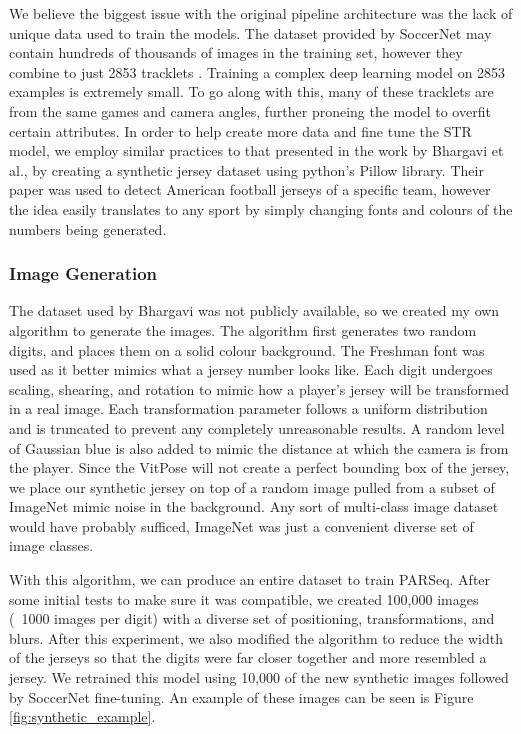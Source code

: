\documentclass[11pt, letterpaper]{article}
\begin{document}
We believe the biggest issue with the original pipeline architecture was the lack of unique data used to train the models. The dataset provided by SoccerNet may contain hundreds of thousands of images in the training set, however they combine to just 2853 tracklets \cite{soccernet_repo}. Training a complex deep learning model on 2853 examples is extremely small. To go along with this, many of these tracklets are from the same games and camera angles, further proneing the model to overfit certain attributes. In order to help create more data and fine tune the STR model, we employ similar practices to that presented in the work by Bhargavi et al., by creating a synthetic jersey dataset using python's Pillow library. Their paper was used to detect American football jerseys of a specific team, however the idea easily translates to any sport by simply changing fonts and colours of the numbers being generated. 

\subsubsection{Image Generation}

The dataset used by Bhargavi was not publicly available, so we created my own algorithm to generate the images. The algorithm first generates two random digits, and places them on a solid colour background. The Freshman font was used as it better mimics what a jersey number looks like. Each digit undergoes scaling, shearing, and rotation to mimic how a player's jersey will be transformed in a real image. Each transformation parameter follows a uniform distribution and is truncated to prevent any completely unreasonable results. A random level of Gaussian blue is also added to mimic the distance at which the camera is from the player. Since the VitPose will not create a perfect bounding box of the jersey, we place our synthetic jersey on top of a random image pulled from a subset of ImageNet mimic noise in the background. Any sort of multi-class image dataset would have probably sufficed, ImageNet was just a convenient diverse set of image classes.

With this algorithm, we can produce an entire dataset to train PARSeq. After some initial tests to make sure it was compatible, we created 100,000 images (~1000 images per digit) with a diverse set of positioning, transformations, and blurs. After this experiment, we also modified the algorithm to reduce the width of the jerseys so that the digits were far closer together and more resembled a jersey. We retrained this model using 10,000 of the new synthetic images followed by SoccerNet fine-tuning. An example of these images can be seen is Figure \ref{fig:synthetic_example}.
\end{document}
